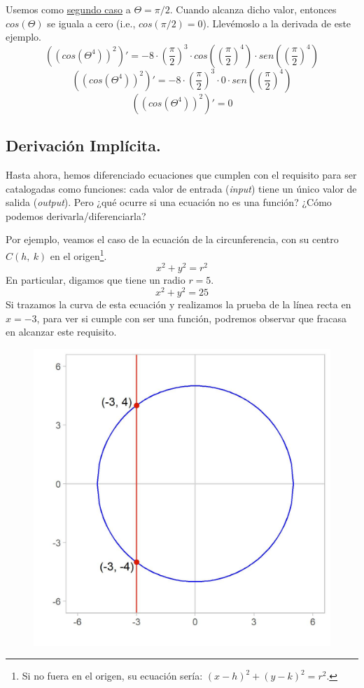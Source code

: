 \documentclass[12pt]{article}
\begin{document}
Usemos como \underline{segundo caso} a $\Theta = \pi/2$. Cuando alcanza dicho valor, entonces $cos(\Theta)$ se iguala a cero (i.e., $cos(\pi/2) = 0$). Llevémoslo a la derivada de este ejemplo.
\[((cos(\Theta^{4}))^{2})' = -8 \cdot \left(\frac{\pi}{2}\right)^{3} \cdot cos\left(\left(\frac{\pi}{2}\right)^{4}\right) \cdot sen\left(\left(\frac{\pi}{2}\right)^{4}\right)\]
\[((cos(\Theta^{4}))^{2})' = -8 \cdot \left(\frac{\pi}{2}\right)^{3} \cdot 0 \cdot sen\left(\left(\frac{\pi}{2}\right)^{4}\right)\]
\[((cos(\Theta^{4}))^{2})' = 0\]




\subsection{Derivación Implícita.}

Hasta ahora, hemos diferenciado ecuaciones que cumplen con el requisito para ser catalogadas como funciones: cada valor de entrada (\textit{input}) tiene un único valor de salida (\textit{output}). Pero ¿qué ocurre si una ecuación no es una función? ¿Cómo podemos derivarla/diferenciarla?

Por ejemplo, veamos el caso de la ecuación de la circunferencia, con su centro $C(h, \ k)$ en el origen\footnote{Si no fuera en el origen, su ecuación sería: $(x - h)^{2} + (y - k)^{2} = r^{2}$.}.
\[x^{2} + y^{2} = r^{2}\]
En particular, digamos que tiene un radio $r = 5$.
\[x^{2}+y^{2} = 25\]
Si trazamos la curva de esta ecuación y realizamos la prueba de la línea recta en $x = -3$, para ver si cumple con ser una función, podremos observar que fracasa en alcanzar este requisito.

\begin{figure}[hbt!]
\centering
\includegraphics[scale=0.7]{img/implicit_diff.jpg}
\end{figure}
\end{document}
